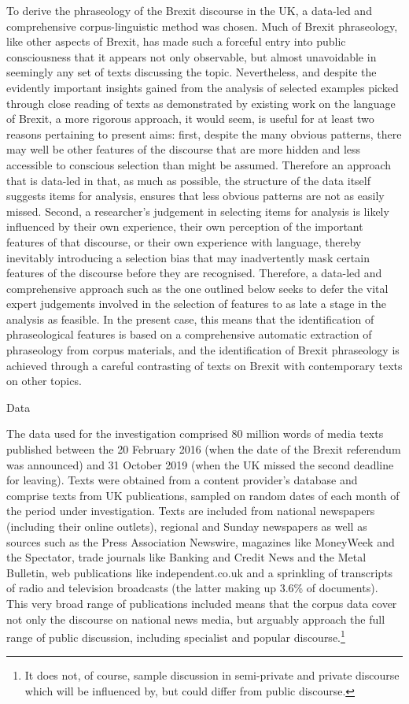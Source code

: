 \documentclass[output=paper]{langscibook}
\begin{document}
To derive the phraseology of the Brexit discourse in the UK, a data-led and comprehensive corpus-linguistic method was chosen. Much of Brexit phraseology, like other aspects of Brexit, has made such a forceful entry into public consciousness that it appears not only observable, but almost unavoidable in seemingly any set of texts discussing the topic. Nevertheless, and despite the evidently important insights gained from the analysis of selected examples picked through close reading of texts as demonstrated by existing work on the language of Brexit, a more rigorous approach, it would seem, is useful for at least two reasons pertaining to present aims: first, despite the many obvious patterns, there may well be other features of the discourse that are more hidden and less accessible to conscious selection than might be assumed. Therefore an approach that is data-led in that, as much as possible, the structure of the data itself suggests items for analysis, ensures that less obvious patterns are not as easily missed. Second, a researcher’s judgement in selecting items for analysis is likely influenced by their own experience, their own perception of the important features of that discourse, or their own experience with language, thereby inevitably introducing a selection bias that may inadvertently mask certain features of the discourse before they are recognised. Therefore, a data-led and comprehensive approach such as the one outlined below seeks to defer the vital expert judgements involved in the selection of features to as late a stage in the analysis as feasible. In the present case, this means that the identification of phraseological features is based on a comprehensive automatic extraction of phraseology from corpus materials, and the identification of Brexit phraseology is achieved through a careful contrasting of texts on Brexit with contemporary texts on other topics.

Data

The data used for the investigation comprised 80 million words of media texts published between the 20 February 2016 (when the date of the Brexit referendum was announced) and 31 October 2019 (when the UK missed the second deadline for leaving). Texts were obtained from a content provider’s database and comprise texts from UK publications, sampled on random dates of each month of the period under investigation. Texts are included from national newspapers (including their online outlets), regional and Sunday newspapers as well as sources such as the Press Association Newswire, magazines like MoneyWeek and the Spectator, trade journals like Banking and Credit News and the Metal Bulletin, web publications like independent.co.uk and a sprinkling of transcripts of radio and television broadcasts (the latter making up 3.6\% of documents). This very broad range of publications included means that the corpus data cover not only the discourse on national news media, but arguably approach the full range of public discussion, including specialist and popular discourse.\footnote{It does not, of course, sample discussion in semi-private and private discourse which will be influenced by, but could differ from public discourse.}
\end{document}
